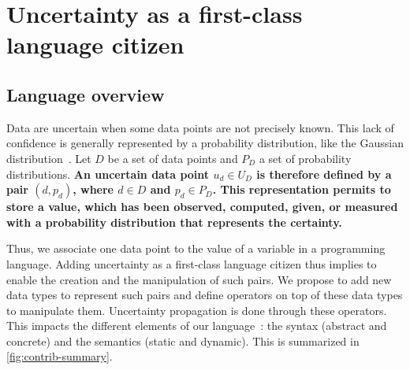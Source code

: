 \section{Uncertainty as a first-class language citizen}
\label{sec:data-uncertainty}


\subsection{Language overview}
Data are uncertain when some data points are not precisely known. 
This lack of confidence is generally represented by a probability distribution, like the Gaussian distribution~\cite{metrology2008evaluation}.
Let $D$ be a set of data points and $P_D$ a set of probability distributions.
\textbf{An uncertain data point $u_d \in U_D$ is therefore defined by a pair $(d, p_d)$, where $d \in D$ and $p_d \in P_D$.
This representation permits to store a value, which has been observed, computed, given, or measured with a probability distribution that represents the certainty.}

Thus, we associate one data point to the value of a variable in a programming language.
Adding uncertainty as a first-class language citizen thus implies to enable the creation and the manipulation of such  pairs.
We propose to add new data types to represent such pairs and define operators on top of these data types to  manipulate them.
Uncertainty propagation is done through these operators.
This impacts the different elements of our language~\cite{DBLP:journals/computer/HarelR04, DBLP:phd/hal/Degueule16}: the syntax (abstract and concrete) and the semantics (static and dynamic).
This is summarized in \autoref{fig:contrib-summary}.


